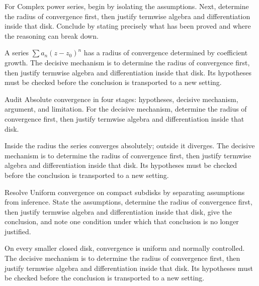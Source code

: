 \begin{problem}\label{prob:iv03-problem-01}
For Complex power series, begin by isolating the assumptions. Next, determine the radius of convergence first, then justify termwise algebra and differentiation inside that disk. Conclude by stating precisely what has been proved and where the reasoning can break down.
\end{problem}
\begin{solution}
A series $\sum a_n(z-z_0)^n$ has a radius of convergence determined by coefficient growth. The decisive mechanism is to determine the radius of convergence first, then justify termwise algebra and differentiation inside that disk. Its hypotheses must be checked before the conclusion is transported to a new setting.
\end{solution}

\begin{problem}\label{prob:iv03-problem-02}
Audit Absolute convergence in four stages: hypotheses, decisive mechanism, argument, and limitation. For the decisive mechanism, determine the radius of convergence first, then justify termwise algebra and differentiation inside that disk.
\end{problem}
\begin{solution}
Inside the radius the series converges absolutely; outside it diverges. The decisive mechanism is to determine the radius of convergence first, then justify termwise algebra and differentiation inside that disk. Its hypotheses must be checked before the conclusion is transported to a new setting.
\end{solution}

\begin{problem}\label{prob:iv03-problem-03}
Resolve Uniform convergence on compact subdisks by separating assumptions from inference. State the assumptions, determine the radius of convergence first, then justify termwise algebra and differentiation inside that disk, give the conclusion, and note one condition under which that conclusion is no longer justified.
\end{problem}
\begin{solution}
On every smaller closed disk, convergence is uniform and normally controlled. The decisive mechanism is to determine the radius of convergence first, then justify termwise algebra and differentiation inside that disk. Its hypotheses must be checked before the conclusion is transported to a new setting.
\end{solution}

